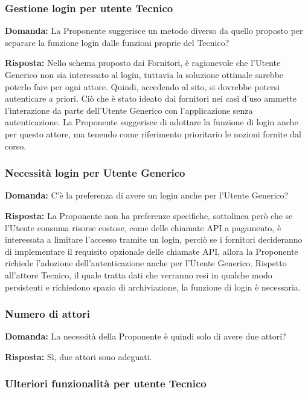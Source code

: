 \subsubsection{Gestione login per utente Tecnico}

\textbf{Domanda:} La Proponente suggerisce un metodo diverso da quello proposto per separare la funzione login dalle funzioni proprie del Tecnico?

\textbf{Risposta:} Nello schema proposto dai Fornitori, è ragionevole che l'Utente Generico non sia interessato al login, tuttavia la soluzione ottimale sarebbe poterlo fare per ogni attore. Quindi, accedendo al sito, si dovrebbe potersi autenticare a priori.
Ciò che è stato ideato dai fornitori nei casi d’uso ammette l’interazione da parte dell’Utente Generico con l’applicazione senza autenticazione. La Proponente suggerisce di adottare la funzione di login anche per questo attore, ma tenendo come riferimento prioritario le nozioni fornite dal corso. 

\subsubsection{Necessità login per Utente Generico}

\textbf{Domanda:} C'è la preferenza di avere un login anche per l'Utente Generico?

\textbf{Risposta:} La Proponente non ha preferenze specifiche, sottolinea però che se l’Utente consuma risorse costose, come delle chiamate API a pagamento, è interessata a limitare l’accesso tramite un login, perciò se i fornitori decideranno di implementare il requisito opzionale delle chiamate API, allora la Proponente richiede l’adozione dell’autenticazione anche per l’Utente Generico. Rispetto all’attore Tecnico, il quale tratta dati che verranno resi in qualche modo persistenti e richiedono spazio di archiviazione, la funzione di login è necessaria.

\subsubsection{Numero di attori}

\textbf{Domanda:} La necessità della Proponente è quindi solo di avere due attori?

\textbf{Risposta:} Sì, due attori sono adeguati.


\subsubsection{Ulteriori funzionalità per utente Tecnico}

